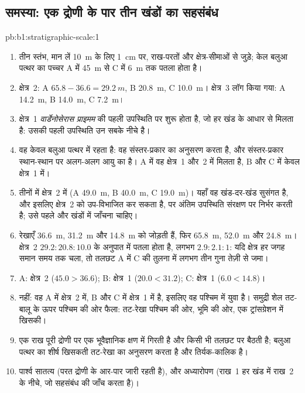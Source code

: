 \subsection*{समस्या: एक द्रोणी के पार तीन खंडों का सहसंबंध}

\begin{solution}{pb:b1:stratigraphic-scale:1}
\begin{enumerate}
\item तीन स्तंभ, मान लें \qty{10}{m} के लिए \qty{1}{cm} पर, राख-परतों और क्षेत्र-सीमाओं से जुड़े; केल बलुआ पत्थर का पच्चर A में \qty{45}{m} से C में \qty{6}{m} तक पतला होता है।
  \item क्षेत्र~2: A $65.8 - 36.6 = \qty{29.2}{m}$, B \qty{20.8}{m}, C \qty{10.0}{m}। क्षेत्र~3 लॉग किया गया: A \qty{14.2}{m}, B \qty{14.0}{m}, C \qty{7.2}{m}।
  \item क्षेत्र~1 \emph{वार्डेनोसेरास प्राइमम} की पहली उपस्थिति पर शुरू होता है, जो हर खंड के आधार से मिलता है: उसकी पहली उपस्थिति उन सबके नीचे है।
  \item वह केवल बलुआ पत्थर में रहता है: वह संस्तर-प्रकार का अनुसरण करता है, और संस्तर-प्रकार स्थान-स्थान पर अलग-अलग आयु का है। A में वह क्षेत्र~1 और~2 में मिलता है, B और C में केवल क्षेत्र~1 में।
  \item तीनों में क्षेत्र~2 में (A \qty{49.0}{m}, B \qty{40.0}{m}, C \qty{19.0}{m})। यहाँ वह खंड-दर-खंड सुसंगत है, और इसलिए क्षेत्र~2 को उप-विभाजित कर सकता है, पर अंतिम उपस्थिति संरक्षण पर निर्भर करती है; उसे पहले और खंडों में जाँचना चाहिए।
  \item रेखाएँ \qty{36.6}{m}, \qty{31.2}{m} और \qty{14.8}{m} को जोड़ती हैं, फिर \qty{65.8}{m}, \qty{52.0}{m} और \qty{24.8}{m}। क्षेत्र~2 $29.2 : 20.8 : 10.0$ के अनुपात में पतला होता है, लगभग $2.9 : 2.1 : 1$: यदि क्षेत्र हर जगह समान समय तक चला, तो तलछट A में C की तुलना में लगभग तीन गुना तेज़ी से जमा।
  \item A: क्षेत्र~2 ($45.0 > 36.6$); B: क्षेत्र~1 ($20.0 < 31.2$); C: क्षेत्र~1 ($6.0 < 14.8$)।
  \item नहीं: वह A में क्षेत्र~2 में, B और C में क्षेत्र~1 में है, इसलिए वह पश्चिम में युवा है। समुद्री शेल तट-बालू के ऊपर पश्चिम की ओर फैला: तट-रेखा पश्चिम की ओर, भूमि की ओर, एक ट्रांसग्रेशन में खिसकी।
  \item एक राख पूरी द्रोणी पर एक भूवैज्ञानिक क्षण में गिरती है और किसी भी तलछट पर बैठती है; बलुआ पत्थर का शीर्ष खिसकती तट-रेखा का अनुसरण करता है और तिर्यक-कालिक है।
  \item पार्श्व सातत्य (परत द्रोणी के आर-पार जारी रहती है), और अध्यारोपण (राख~1 हर खंड में राख~2 के नीचे, जो सहसंबंध की जाँच करता है)।

\end{enumerate}
\end{solution}
